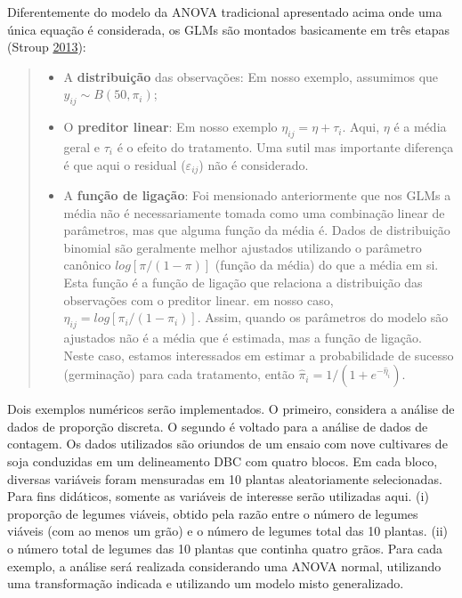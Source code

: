 \documentclass[
]{book}
\numberwithin{equation}{section}
\newcommand{\indt}[1]{\index{#1|ST}}
\begin{document}
Diferentemente do modelo da ANOVA\indt{ANOVA} tradicional apresentado acima onde uma única equação é considerada, os GLMs\indt{GLMs} são montados basicamente em três etapas (Stroup \protect\hyperlink{ref-Stroup2013}{2013}):

\begin{quote}
\begin{itemize}
\item
  A \textbf{distribuição} das observações: Em nosso exemplo, assumimos que \(y_{ij} \sim B(50, \pi_i)\);
\item
  O \textbf{preditor linear}: Em nosso exemplo \(\eta_{ij} = \eta + \tau_{i}\). Aqui, \(\eta\) é a média geral e \(\tau_{i}\) é o efeito do tratamento. Uma sutil mas importante diferença é que aqui o residual (\(\varepsilon_{ij}\)) não é considerado.
\item
  A \textbf{função de ligação}: Foi mensionado anteriormente que nos GLMs\indt{GLMs} a média não é necessariamente tomada como uma combinação linear de parâmetros, mas que alguma função da média é. Dados de distribuição binomial são geralmente melhor ajustados utilizando o parâmetro canônico \(log[\pi/(1-\pi)]\) (função da média) do que a média em si. Esta função é a função de ligação que relaciona a distribuição das observações com o preditor linear. em nosso caso, \(\eta_{ij} = log[\pi_{i}/(1-\pi_{i})]\). Assim, quando os parâmetros do modelo são ajustados não é a média que é estimada, mas a função de ligação. Neste caso, estamos interessados em estimar a probabilidade de sucesso (germinação) para cada tratamento, então \(\hat \pi_{i} = 1/(1 + e ^ {-\hat \eta_{i}})\).
\end{itemize}
\end{quote}

Dois exemplos numéricos serão implementados. O primeiro, considera a análise de dados de proporção discreta. O segundo é voltado para a análise de dados de contagem. Os dados utilizados são oriundos de um ensaio com nove cultivares de soja conduzidas em um delineamento DBC com quatro blocos. Em cada bloco, diversas variáveis foram mensuradas em 10 plantas aleatoriamente selecionadas. Para fins didáticos, somente as variáveis de interesse serão utilizadas aqui. (i) proporção de legumes viáveis, obtido pela razão entre o número de legumes viáveis (com ao menos um grão) e o número de legumes total das 10 plantas. (ii) o número total de legumes das 10 plantas que continha quatro grãos. Para cada exemplo, a análise será realizada considerando uma ANOVA\indt{ANOVA} normal, utilizando uma transformação indicada e utilizando um modelo misto generalizado.
\end{document}
